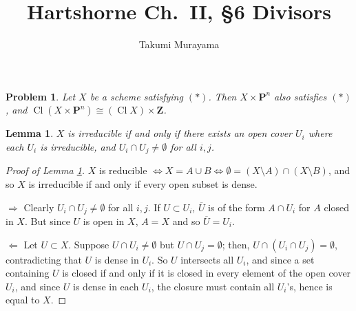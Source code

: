 \documentclass[12pt,letterpaper]{article}
\title{Hartshorne Ch.~II, \S6 Divisors}
\author{Takumi Murayama}
\newtheorem{problem}{Problem}[section]
\newtheorem{lemma}{Lemma}%
\theoremstyle{definition}
\theoremstyle{remark}
\numberwithin{equation}{section}
\numberwithin{figure}{problem}
\DeclareMathOperator{\Cl}{Cl}
\begin{document}
\maketitle
\setcounter{section}{6}
\begin{problem}
  Let $X$ be a scheme satisfying $(*)$. Then $X \times \mathbf{P}^n$ also satisfies $(*)$, and $\Cl(X \times \mathbf{P}^n) \cong (\Cl X) \times \mathbf{Z}$.
\end{problem}
\begin{lemma}\label{irredlem}
  $X$ is irreducible if and only if there exists an open cover $U_i$ where each $U_i$ is irreducible, and $U_i \cap U_j \ne \emptyset$ for all $i,j$.
\end{lemma}
\begin{proof}[Proof of Lemma \ref{irredlem}]
  $X$ is reducible $\Leftrightarrow X = A \cup B \Leftrightarrow\emptyset = (X\setminus A) \cap (X\setminus B)$, and so $X$ is irreducible if and only if every open subset is dense.
  \par $\Rightarrow$ Clearly $U_i \cap U_j \ne \emptyset$ for all $i,j$. If $U \subset U_i$, $\overline{U}$ is of the form $A \cap U_i$ for $A$ closed in $X$. But since $U$ is open in $X$, $A = X$ and so $\overline{U} = U_i$.
  \par $\Leftarrow$ Let $U \subset X$. Suppose $U \cap U_i \ne \emptyset$ but $U \cap U_j = \emptyset$; then, $U \cap (U_i \cap U_j) = \emptyset$, contradicting that $U$ is dense in $U_i$. So $U$ intersects all $U_i$, and since a set containing $U$ is closed if and only if it is closed in every element of the open cover $U_i$, and since $U$ is dense in each $U_i$, the closure must contain all $U_i$'s, hence is equal to $X$.
\end{proof}
\end{document}
